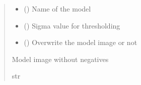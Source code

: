 \documentclass[letterpaper,10pt,english]{sphinxmanual}
\begin{document}
\begin{fulllineitems}
\begin{fulllineitems}
\begin{quote}
\begin{description}
\begin{itemize}
\item {} 
\sphinxAtStartPar
{} () \textendash{} Name of the model

\item {} 
\sphinxAtStartPar
{} () \textendash{} Sigma value for thresholding

\item {} 
\sphinxAtStartPar
{} () \textendash{} Overwrite the model image or not

\end{itemize}

\item[{Returns}] \leavevmode
\sphinxAtStartPar
Model image without negatives

\item[{Return type}] \leavevmode
\sphinxAtStartPar
str

\end{description}\end{quote}

\end{fulllineitems}



\end{fulllineitems}
\end{document}
